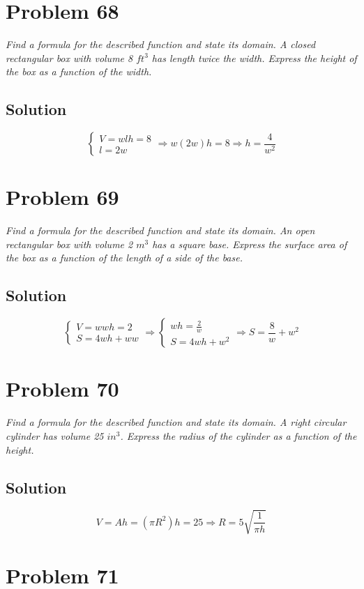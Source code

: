 \documentclass[11pt]{article}
\newcommand{\soln}{\subsection*}
\newcommand{\qn}{\textit}
\begin{document}
\section*{Problem 68}

\qn{Find a formula for the described function and state its domain. A closed rectangular box with volume 8 $ft^3$ has length twice the width. Express the height of the box as a function of the width.}

\soln{Solution}
\begin{equation*}
	\begin{cases}
		V=wlh=8 \\
		l=2w
	\end{cases}
	\Rightarrow
	w(2w)h=8
	\Rightarrow
	h=\frac{4}{w^2} 
\end{equation*}

\section*{Problem 69}

\qn{Find a formula for the described function and state its domain. An open rectangular box with volume 2 $m^3$ has a square base. Express the surface area of the box as a function of the length of a side of the base.}

\soln{Solution}
\begin{equation*}
	\begin{cases}
		V=wwh=2\\
		S=4wh+ww
	\end{cases}
	\Rightarrow
	\begin{cases}
		wh=\frac{2}{w}\\
		S=4wh+w^2
	\end{cases}
	\Rightarrow
	S=\frac{8}{w}+w^2
\end{equation*}

\section*{Problem 70}

\qn{Find a formula for the described function and state its domain. A right circular cylinder has volume 25 $in^3$. Express the radius of the cylinder as a function of the height.}

\soln{Solution}
\begin{equation*}
	V=Ah=(\pi R^2)h=25 \Rightarrow R=5\sqrt{\frac{1}{\pi h}}
\end{equation*}

\section*{Problem 71}
\end{document}
